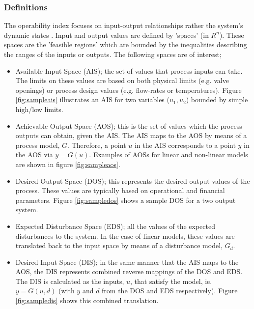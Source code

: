 \subsubsection{Definitions}
The operability index focuses on input-output relationships rather the system's dynamic states \citep{vinsonphd}. 
Input and output values are defined by 'spaces' (in $R^n$). 
These spaces are the 'feasible regions' which are bounded by the inequalities describing the ranges of the inputs or outputs. 
The following spaces are of interest;
\begin{itemize}
  \item Available Input Space (AIS); the set of values that process      inputs can take. 
    The limits on these values are based on both physical limits (e.g.     valve openings) or process design values (e.g. flow-rates or temperatures). 
Figure \ref{fig:sampleais} illustrates an AIS for two variables ($u_1, u_2$) bounded by simple high/low limits.
  \item Achievable Output Space (AOS); this is the set of values which the process outputs can obtain, given the AIS. 
The AIS maps to the AOS by means of a process model, $G$. 
Therefore, a point $u$ in the AIS corresponds to a point $y$ in the AOS via $y=G(u)$. 
Examples of AOSs for linear and non-linear models are shown in figure \ref{fig:sampleaos}.
  \item Desired Output Space (DOS); this represents the desired output values of the process. 
These values are typically based on operational and financial   parameters. 
Figure \ref{fig:sampledos} shows a sample DOS for a two output    system.
  \item Expected Disturbance Space (EDS); all the values of the expected disturbances to the system. 
In the case of linear models, these values are translated back to the input space by means of a disturbance model, $G_d$.
  \item Desired Input Space (DIS); in the same manner that the AIS maps to the AOS, the DIS represents combined reverse mappings of the DOS and EDS.
The DIS is calculated as the inputs, $u$, that satisfy the model, ie. $y=G(u,d)$ (with $y$ and $d$ from the DOS and EDS respectively).
Figure \ref{fig:sampledis} shows this combined translation.
\end{itemize}

